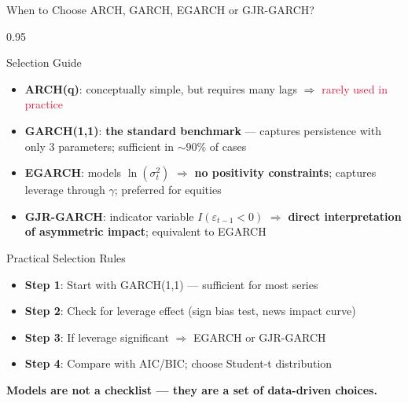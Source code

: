 \documentclass[9pt, aspectratio=169, t]{beamer}
\begin{document}
\begin{frame}{When to Choose ARCH, GARCH, EGARCH or GJR-GARCH?}
    \begin{cminipage}{0.95\textwidth}
        \vspace{-0.2cm}
        \scriptsize
        \begin{block}{Selection Guide}
            \begin{itemize}\setlength{\itemsep}{1pt}
                \item \textbf{ARCH(q)}: conceptually simple, but requires many lags $\Rightarrow$ \textcolor{Crimson}{rarely used in practice}
                \item \textbf{GARCH(1,1)}: \textcolor{Forest}{\textbf{the standard benchmark}} --- captures persistence with only 3 parameters; sufficient in $\sim$90\% of cases
                \item \textbf{EGARCH}: models $\ln(\sigma_t^2)$ $\Rightarrow$ \textbf{no positivity constraints}; captures leverage through $\gamma$; \textcolor{Forest}{preferred for equities}
                \item \textbf{GJR-GARCH}: indicator variable $I(\varepsilon_{t-1}<0)$ $\Rightarrow$ \textbf{direct interpretation of asymmetric impact}; equivalent to EGARCH
            \end{itemize}
        \end{block}
        \vspace{-1.5mm}
        \begin{alertblock}{Practical Selection Rules}
            \begin{itemize}\setlength{\itemsep}{0pt}
                \item \textbf{Step 1}: Start with GARCH(1,1) --- sufficient for most series
                \item \textbf{Step 2}: Check for leverage effect (sign bias test, news impact curve)
                \item \textbf{Step 3}: If leverage significant $\Rightarrow$ EGARCH or GJR-GARCH
                \item \textbf{Step 4}: Compare with AIC/BIC; choose Student-t distribution
            \end{itemize}
        \end{alertblock}
        \vspace{-1mm}
        \begin{center}
            {\footnotesize\textcolor{MainBlue}{\textbf{Models are not a checklist --- they are a set of data-driven choices.}}}
        \end{center}
    \end{cminipage}
\end{frame}
\end{document}
